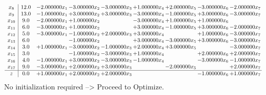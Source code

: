 \documentclass[10pt]{article}
\begin{document}
\[\begin{array}{c| c c@{\hskip 2pt} c@{\hskip 2pt} c@{\hskip 2pt} c@{\hskip 2pt} c@{\hskip 2pt} c@{\hskip 2pt} c@{\hskip 2pt} }
 x_{8}   &  12.0 & -2.000000 x_{1} & -3.000000 x_{2} & -3.000000 x_{3} & + 1.000000 x_{4} & + 2.000000 x_{5} & -3.000000 x_{6} & -2.000000 x_{7}\\
 x_{9}   &  13.0 & -1.000000 x_{1} & + 3.000000 x_{2} & + 3.000000 x_{3} & -3.000000 x_{4} & -1.000000 x_{5} & + 3.000000 x_{6} & -3.000000 x_{7}\\
 x_{10}   &  9.0 & -2.000000 x_{1} & + 1.000000 x_{2} &   & -3.000000 x_{4} & + 1.000000 x_{5} & + 1.000000 x_{6} &   \\
 x_{11}   &  6.0 & -3.000000 x_{1} & + 1.000000 x_{2} &   & + 3.000000 x_{4} & -1.000000 x_{5} & + 3.000000 x_{6} & -2.000000 x_{7}\\
 x_{12}   &  5.0 & -3.000000 x_{1} & -1.000000 x_{2} & + 2.000000 x_{3} & + 3.000000 x_{4} &   & + 1.000000 x_{6} & -3.000000 x_{7}\\
 x_{13}   &  6.0  &   & -1.000000 x_{2} &   & + 3.000000 x_{4} & -3.000000 x_{5} & + 3.000000 x_{6} & -3.000000 x_{7}\\
 x_{14}   &  3.0 & + 1.000000 x_{1} & -3.000000 x_{2} & -1.000000 x_{3} & + 2.000000 x_{4} & + 3.000000 x_{5} &   & -3.000000 x_{7}\\
 x_{15}   &  3.0  &   & -1.000000 x_{2} & -3.000000 x_{3} & + 1.000000 x_{4} &   & + 2.000000 x_{6} & + 2.000000 x_{7}\\
 x_{16}   &  4.0 & -1.000000 x_{1} & + 3.000000 x_{2} & -3.000000 x_{3} & -1.000000 x_{4} &   & -3.000000 x_{6} & -1.000000 x_{7}\\
 x_{17}   &  9.0 & -3.000000 x_{1} & + 2.000000 x_{2} & + 3.000000 x_{3} &   & -2.000000 x_{5} &   & + 2.000000 x_{7}\\
\hline
z    &  0.0 & + 1.000000 x_{1} & + 2.000000 x_{2} & + 2.000000 x_{3} &    &   & -1.000000 x_{6} & + 1.000000 x_{7}\\
\end{array}\]
No initialization required --> Proceed to Optimize. 
\end{document}
